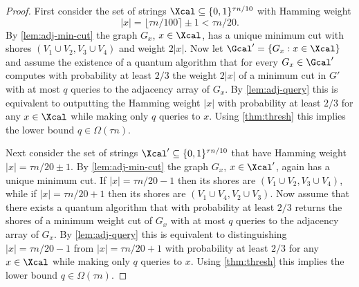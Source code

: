 \begin{proof}
First consider the set of strings $\Xcal \subseteq \{0,1\}^{\tau n/10}$ with Hamming weight
\[
|x|
= \lfloor \tau n/100 \rceil \pm 1
< \tau n/20.
\]
By \cref{lem:adj-min-cut} the graph $G_x$, $x \in \Xcal$, has a unique minimum cut with shores $(V_1 \cup V_2, V_3 \cup V_4)$ and weight $2|x|$.
Now let $\Gcal' = \{G_x : x \in \Xcal\}$ and assume the existence of a quantum algorithm that for every $G_x \in \Gcal'$ computes with probability at least $2/3$ the weight $2|x|$ of a minimum cut in $G'$ with at most $q$ queries to the adjacency array of $G_x$.
By \cref{lem:adj-query} this is equivalent to outputting the Hamming weight $|x|$ with probability at least $2/3$ for any $x \in \Xcal$ while making only $q$ queries to $x$.
Using \cref{thm:thresh} this implies the lower bound $q \in \Omega(\tau n)$.

Next consider the set of strings $\Xcal' \subseteq \{0,1\}^{\tau n/10}$ that have Hamming weight $|x| = \tau n/20 \pm 1$.
By \cref{lem:adj-min-cut} the graph $G_x$, $x \in \Xcal'$, again has a unique minimum cut.
If $|x| = \tau n/20 - 1$ then its shores are $(V_1 \cup V_2, V_3 \cup V_4)$, while if $|x| = \tau n/20 + 1$ then its shores are $(V_1 \cup V_4, V_2 \cup V_3)$.
Now assume that there exists a quantum algorithm that with probability at least $2/3$ returns the shores of a minimum weight cut of $G_x$ with at most $q$ queries to the adjacency array of $G_x$.
By \cref{lem:adj-query} this is equivalent to distinguishing $|x| = \tau n/20 - 1$ from $|x| = \tau n/20 + 1$ with probability at least $2/3$ for any $x \in \Xcal$ while making only $q$ queries to $x$.
Using \cref{thm:thresh} this implies the lower bound $q \in \Omega(\tau n)$.
\end{proof}
